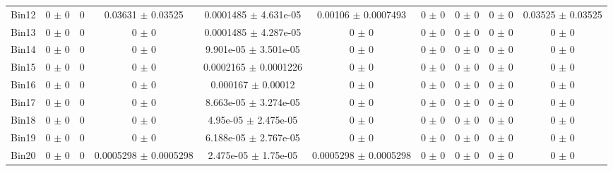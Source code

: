 \begin{tabular}{@{\extracolsep{4pt}}lccccccccc@{}}
     Bin12 & 0 $\pm$ 0 & 0 & 0.03631 $\pm$ 0.03525 & 0.0001485 $\pm$ 4.631e-05 & 0.00106 $\pm$ 0.0007493 & 0 $\pm$ 0 & 0 $\pm$ 0 & 0 $\pm$ 0 & 0.03525 $\pm$ 0.03525 \\ 
     Bin13 & 0 $\pm$ 0 & 0 & 0 $\pm$ 0 & 0.0001485 $\pm$ 4.287e-05 & 0 $\pm$ 0 & 0 $\pm$ 0 & 0 $\pm$ 0 & 0 $\pm$ 0 & 0 $\pm$ 0 \\ 
     Bin14 & 0 $\pm$ 0 & 0 & 0 $\pm$ 0 & 9.901e-05 $\pm$ 3.501e-05 & 0 $\pm$ 0 & 0 $\pm$ 0 & 0 $\pm$ 0 & 0 $\pm$ 0 & 0 $\pm$ 0 \\ 
     Bin15 & 0 $\pm$ 0 & 0 & 0 $\pm$ 0 & 0.0002165 $\pm$ 0.0001226 & 0 $\pm$ 0 & 0 $\pm$ 0 & 0 $\pm$ 0 & 0 $\pm$ 0 & 0 $\pm$ 0 \\ 
     Bin16 & 0 $\pm$ 0 & 0 & 0 $\pm$ 0 & 0.000167 $\pm$ 0.00012 & 0 $\pm$ 0 & 0 $\pm$ 0 & 0 $\pm$ 0 & 0 $\pm$ 0 & 0 $\pm$ 0 \\ 
     Bin17 & 0 $\pm$ 0 & 0 & 0 $\pm$ 0 & 8.663e-05 $\pm$ 3.274e-05 & 0 $\pm$ 0 & 0 $\pm$ 0 & 0 $\pm$ 0 & 0 $\pm$ 0 & 0 $\pm$ 0 \\ 
     Bin18 & 0 $\pm$ 0 & 0 & 0 $\pm$ 0 & 4.95e-05 $\pm$ 2.475e-05 & 0 $\pm$ 0 & 0 $\pm$ 0 & 0 $\pm$ 0 & 0 $\pm$ 0 & 0 $\pm$ 0 \\ 
     Bin19 & 0 $\pm$ 0 & 0 & 0 $\pm$ 0 & 6.188e-05 $\pm$ 2.767e-05 & 0 $\pm$ 0 & 0 $\pm$ 0 & 0 $\pm$ 0 & 0 $\pm$ 0 & 0 $\pm$ 0 \\ 
     Bin20 & 0 $\pm$ 0 & 0 & 0.0005298 $\pm$ 0.0005298 & 2.475e-05 $\pm$ 1.75e-05 & 0.0005298 $\pm$ 0.0005298 & 0 $\pm$ 0 & 0 $\pm$ 0 & 0 $\pm$ 0 & 0 $\pm$ 0 \\ 
\hline\hline
  \end{tabular}
